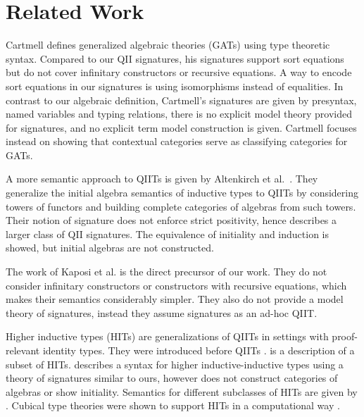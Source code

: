 \documentclass[sigplan,review,anonymous]{acmart}\settopmatter{printfolios=true,printccs=false,printacmref=false}
\begin{document}
\section{Related Work}
\label{sec:relatedwork}

Cartmell \cite{gat} defines generalized algebraic theories (GATs) using type
theoretic syntax. Compared to our QII signatures, his signatures support sort
equations but do not cover infinitary constructors or recursive equations. A way
to encode sort equations in our signatures is using isomorphisms instead of
equalities. In contrast to our algebraic definition, Cartmell's signatures are
given by presyntax, named variables and typing relations, there is no explicit
model theory provided for signatures, and no explicit term model construction is
given. Cartmell focuses instead on showing that contextual categories serve as
classifying categories for GATs.

A more semantic approach to QIITs is given by Altenkirch et al.\
\cite{gabe}. They generalize the initial algebra semantics of
inductive types to QIITs by considering towers of functors and
building complete categories of algebras from such towers. Their
notion of signature does not enforce strict positivity, hence
describes a larger class of QII signatures. The equivalence of
initiality and induction is showed, but initial algebras are not
constructed.

The work of Kaposi et al. \cite{kaposi2019constructing} is the direct precursor
of our work. They do not consider infinitary constructors or constructors with
recursive equations, which makes their semantics considerably simpler. They also
do not provide a model theory of signatures, instead they assume signatures as
an ad-hoc QIIT.


Higher inductive types (HITs) are generalizations of QIITs in settings with
proof-relevant identity types. They were introduced before QIITs
\cite{HoTTbook}. \cite{niels} is a description of a subset of HITs. \cite{hiit}
describes a syntax for higher inductive-inductive types using a theory of
signatures similar to ours, however does not construct categories of algebras or
show initiality. Semantics for different subclasses of HITs are given by
\cite{lumsdaineShulman,10.1145/3209108.3209130,nielsmsc,sojakova,moeneclaey}. Cubical
type theories were shown to support HITs in a computational way
\cite{niels,hiit}.
\end{document}
